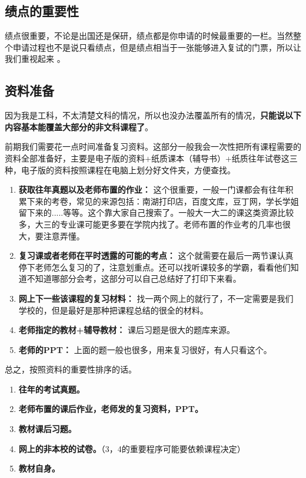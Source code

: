 \documentclass[a4paper]{article}
\begin{document}
\subsection{绩点的重要性} \label{sub:importance}
绩点很重要，不论是出国还是保研，绩点都是你申请的时候最重要的一栏。当然整个申请过程也不是说只看绩点，但是绩点相当于一张能够进入复试的门票，所以让我们重视起来 \faSmileO。

\subsection{资料准备} \label{sub:prepare}
因为我是工科，不太清楚文科的情况，所以也没办法覆盖所有的情况，\textbf{只能说以下内容基本能覆盖大部分的非文科课程了}。

前期我们需要花一点时间准备复习资料。这部分一般我会一次性把所有课程需要的资料全部准备好，主要是电子版的资料+纸质课本（辅导书）+纸质往年试卷这三种，电子版的资料按照课程在电脑上划分好文件夹，方便查找。

\begin{enumerate}
	\item{\textbf{获取往年真题以及老师布置的作业：} 这个很重要，一般一门课都会有往年积累下来的考卷，常见的来源包括：南湖打印店，百度文库，豆丁网，学长学姐留下来的.....等等。这个靠大家自己搜索了。一般大一大二的课这类资源比较多，大三的专业课可能更多要在学院内找了。老师布置的作业考的几率也很大，要注意弄懂。}
    \item{\textbf{复习课或者老师在平时透露的可能的考点：} 这个就需要在最后一两节课认真停下老师怎么复习的了，注意划重点。还可以找听课较多的学霸，看看他们知道不知道哪部分会考，这部分可以自己总结好了打印下来看。}
    \item{\textbf{网上下一些该课程的复习材料：} 找一两个网上的就行了，不一定需要是我们学校的，但是最好是那种把课程总结的很全的材料。}
    \item{\textbf{老师指定的教材+辅导教材：} 课后习题是很大的题库来源。}
    \item{\textbf{老师的PPT：} 上面的题一般也很多，用来复习很好，有人只看这个。}
\end{enumerate}




总之，按照资料的重要性排序的话。

\begin{enumerate}
	\item{\textbf{往年的考试真题。}}
    \item{\textbf{老师布置的课后作业，老师发的复习资料，PPT。}}
    \item{\textbf{教材课后习题。}}
    \item{\textbf{网上的非本校的试卷。}（3，4的重要程序可能要依赖课程决定）}
    \item{\textbf{教材自身。}}
\end{enumerate}
\end{document}

